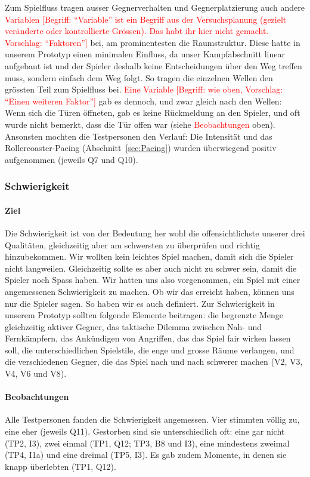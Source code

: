 \documentclass[../Main.tex]{subfiles}
\begin{document}
Zum Spielfluss tragen ausser Gegnerverhalten und Gegnerplatzierung auch andere \textcolor{red}{Variablen [Begriff: \enquote{Variable} ist ein Begriff aus der Versuchsplanung (gezielt veränderte oder kontrollierte Grössen). Das habt ihr hier nicht gemacht. Vorschlag: \enquote{Faktoren}]} bei, am prominentesten die Raumstruktur. Diese hatte in unserem Prototyp einen minimalen Einfluss, da unser Kampfabschnitt linear aufgebaut ist und der Spieler deshalb keine Entscheidungen über den Weg treffen muss, sondern einfach dem Weg folgt. So tragen die einzelnen Wellen den grössten Teil zum Spielfluss bei. \textcolor{red}{Eine Variable [Begriff: wie oben, Vorschlag: \enquote{Einen weiteren Faktor}]} gab es dennoch, und zwar gleich nach den Wellen: Wenn sich die Türen öffneten, gab es keine Rückmeldung an den Spieler, und oft wurde nicht bemerkt, dass die Tür offen war (siehe \textcolor{red}{Beobachtungen} oben). Ansonsten mochten die Testpersonen den Verlauf: Die Intensität und das Rollercoaster-Pacing (Abschnitt~\ref{sec:Pacing}) wurden überwiegend positiv aufgenommen (jeweils Q7 und Q10).

\subsubsection{Schwierigkeit}

\paragraph{Ziel}
Die Schwierigkeit ist von der Bedeutung her wohl die offensichtlichste unserer drei Qualitäten, gleichzeitig aber am schwersten zu überprüfen und richtig hinzubekommen. Wir wollten kein leichtes Spiel machen, damit sich die Spieler nicht langweilen. Gleichzeitig sollte es aber auch nicht zu schwer sein, damit die Spieler noch Spass haben. Wir hatten uns also vorgenommen, ein Spiel mit einer angemessenen Schwierigkeit zu machen. Ob wir das erreicht haben, können uns nur die Spieler sagen. So haben wir es auch definiert. Zur Schwierigkeit in unserem Prototyp sollten folgende Elemente beitragen: die begrenzte Menge gleichzeitig aktiver Gegner, das taktische Dilemma zwischen Nah- und Fernkämpfern, das Ankündigen von Angriffen, das das Spiel fair wirken lassen soll, die unterschiedlichen Spielstile, die enge und grosse Räume verlangen, und die verschiedenen Gegner, die das Spiel nach und nach schwerer machen (V2, V3, V4, V6 und V8).

\paragraph{Beobachtungen}
Alle Testpersonen fanden die Schwierigkeit angemessen. Vier stimmten völlig zu, eine eher (jeweils Q11). Gestorben sind sie unterschiedlich oft: eine gar nicht (TP2, I3), zwei einmal (TP1, Q12; TP3, B8 und I3), eine mindestens zweimal (TP4, I1a) und eine dreimal (TP5, I3). Es gab zudem Momente, in denen sie knapp überlebten (TP1, Q12).
\end{document}

